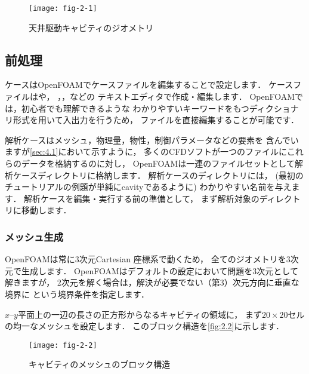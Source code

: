 \begin{figure}[ht]
 \texttt{[image: fig-2-1]}
 \caption{天井駆動キャビティのジオメトリ}
 \label{fig:2.1}
\end{figure}


\subsection{前処理}
\label{ssec:2.1.1}
ケースはOpenFOAMでケースファイルを編集することで設定します．
ケースファイルはや，
，，などの
テキストエディタで作成・編集します．
OpenFOAMでは，初心者でも理解できるような
わかりやすいキーワードをもつディクショナリ形式を用いて入出力を行うため，
ファイルを直接編集することが可能です．

解析ケースはメッシュ，物理量，物性，制御パラメータなどの要素を
含んでいますが\autoref{sec:4.1}において示すように，
多くのCFDソフトが一つのファイルにこれらのデータを格納するのに対し，
OpenFOAMは一連のファイルセットとして解析ケースディレクトリに格納します．
解析ケースのディレクトリには，
(最初のチュートリアルの例題が単純にcavityであるように)
わかりやすい名前を与えます．
解析ケースを編集・実行する前の準備として，
まず解析対象のディレクトリに移動します．

\subsubsection{メッシュ生成}
\label{sssec:2.1.1.1}
%
OpenFOAMは常に3次元Cartesian
%
座標系で動くため，
全てのジオメトリを3次元で生成します．
OpenFOAMはデフォルトの設定において問題を3次元として解きますが，
2次元を解く場合は，解決が必要でない（第3）次元方向に垂直な境界に
%
%
という境界条件を指定します．

$x$--$y$平面上の一辺の長さの正方形からなるキャビティの領域に，
まず$20 $セルの均一なメッシュを設定します．
このブロック構造を\autoref{fig:2.2}に示します．


\begin{figure}[ht]
 \texttt{[image: fig-2-2]}
 \caption{キャビティのメッシュのブロック構造}
 \label{fig:2.2}
\end{figure}


